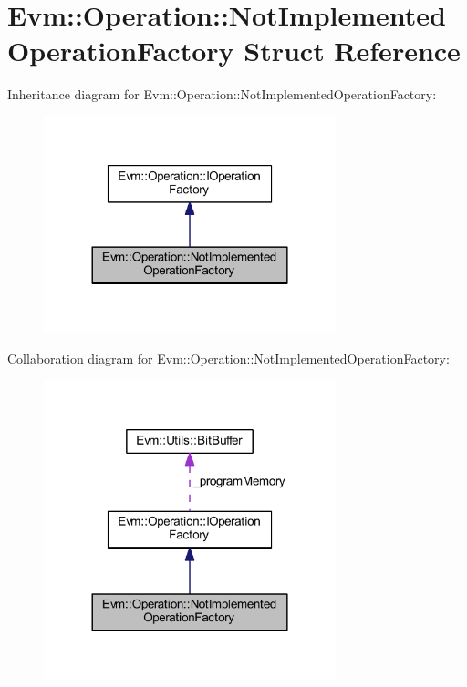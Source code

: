 \hypertarget{struct_evm_1_1_operation_1_1_not_implemented_operation_factory}{}\section{Evm\+:\+:Operation\+:\+:Not\+Implemented\+Operation\+Factory Struct Reference}
\label{struct_evm_1_1_operation_1_1_not_implemented_operation_factory}


Inheritance diagram for Evm\+:\+:Operation\+:\+:Not\+Implemented\+Operation\+Factory\+:
\nopagebreak
\begin{figure}[H]
\begin{center}
\leavevmode
\includegraphics[width=240pt]{struct_evm_1_1_operation_1_1_not_implemented_operation_factory__inherit__graph}
\end{center}
\end{figure}


Collaboration diagram for Evm\+:\+:Operation\+:\+:Not\+Implemented\+Operation\+Factory\+:
\nopagebreak
\begin{figure}[H]
\begin{center}
\leavevmode
\includegraphics[width=240pt]{struct_evm_1_1_operation_1_1_not_implemented_operation_factory__coll__graph}
\end{center}
\end{figure}
